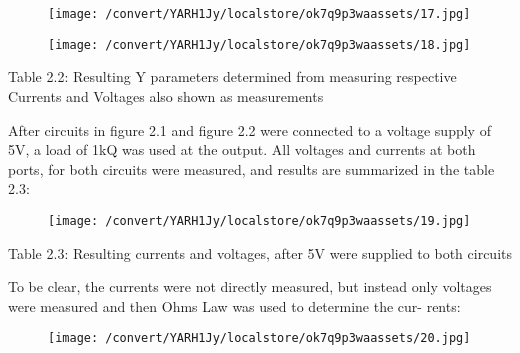 \documentclass[12pt]{report}
\begin{document}
\vspace{10pt}

\begin{figure}[h]

\texttt{[image: /convert/YARH1Jy/localstore/ok7q9p3waassets/17.jpg]}

\centering

\end{figure}

\par

\vspace{10pt}

\begin{figure}[h]

\texttt{[image: /convert/YARH1Jy/localstore/ok7q9p3waassets/18.jpg]}

\centering

\end{figure}

    Table 2.2: Resulting Y parameters determined from measuring respective  Currents and Voltages also shown as measurements 

\vspace{10pt}

    After circuits in figure 2.1 and figure 2.2 were connected to a voltage  supply of 5V, a load of 1kQ was used at the output. All voltages and currents  at both ports, for both circuits were measured, and results are summarized  in the table 2.3: 

\vspace{10pt}

\begin{figure}[h]

\texttt{[image: /convert/YARH1Jy/localstore/ok7q9p3waassets/19.jpg]}

\centering

\end{figure}

    Table 2.3: Resulting currents and voltages, after 5V were supplied to both  circuits 

\vspace{10pt}

    To be clear, the currents were not directly measured, but instead only  voltages were measured and then Ohms Law was used to determine the cur-  rents: 

\vspace{10pt}

\begin{figure}[h]

\texttt{[image: /convert/YARH1Jy/localstore/ok7q9p3waassets/20.jpg]}

\centering

\end{figure}
\end{document}
